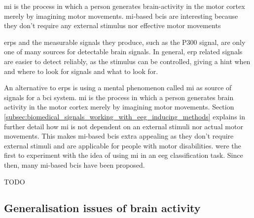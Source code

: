 
\Gls{mi} is the process in which a person generates brain-activity in the motor cortex merely by imagining motor movements.
\Gls{mi}-based \glspl{bci} are interesting because they don't require any external stimulus nor effective motor movements

\glspl{erp} and the measurable signals they produce, such as the P300 signal, are only one of many sources for detectable brain signals.
In general, \gls{erp} related signals are easier to detect reliably, as the stimulus can be controlled, giving a hint when and where to look for signals and what to look for.

An alternative to \glspl{erp} is using a mental phenomenon called \gls{mi} as source of signals for a \gls{bci} system.
\Gls{mi} is the process in which a person generates brain activity in the motor cortex merely by imagining motor movements.
Section \ref{subsec:biomedical_signals_working_with_eeg_inducing_methods} explains in further detail how \gls{mi} is not dependent on an external stimuli nor actual motor movements.
This makes \gls{mi}-based \glspl{bci} extra appealing as they don't require external stimuli and are applicable for people with motor disabilities.
 were the first to experiment with the idea of using \gls{mi} in an \gls{eeg} classification task.
Since then, many \gls{mi}-based \glspl{bci} have been proposed.

TODO


\subsection{Generalisation issues of brain activity}
\label{subsec:biomedical_signals_working_with_eeg_generalisation}



